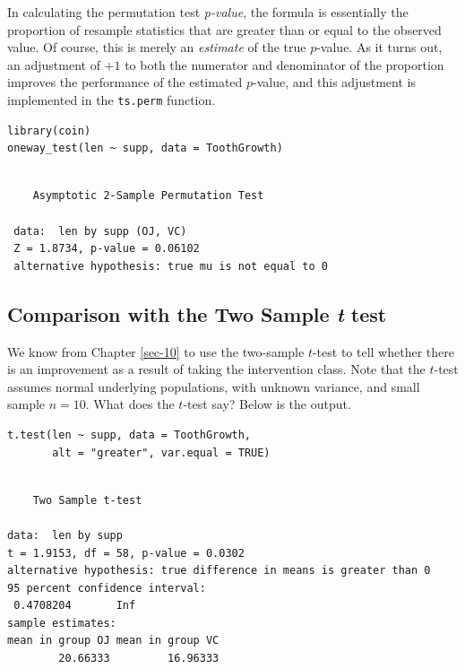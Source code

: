 \documentclass[captions=tableheading]{scrbook}
\begin{document}
\begin{example}
\begin{rem}
In calculating the permutation test \emph{p-value}, the formula is essentially the proportion of resample statistics that are greater than or equal to the observed value. Of course, this is merely an \emph{estimate} of the true \(p\)-value. As it turns out, an adjustment of \(+1\) to both the numerator and denominator of the proportion improves the performance of the estimated \(p\)-value, and this adjustment is implemented in the \texttt{ts.perm} function.
\end{rem}


\begin{verbatim}
library(coin)
oneway_test(len ~ supp, data = ToothGrowth)
\end{verbatim}

\begin{verbatim}
 
 	Asymptotic 2-Sample Permutation Test
 
 data:  len by supp (OJ, VC) 
 Z = 1.8734, p-value = 0.06102
 alternative hypothesis: true mu is not equal to 0
\end{verbatim}
\subsection{Comparison with the Two Sample \emph{t} test}
\label{sec-13-4-2}


We know from Chapter \ref{sec-10} to use the two-sample \(t\)-test to tell whether there is an improvement as a result of taking the intervention class. Note that the \(t\)-test assumes normal underlying populations, with unknown variance, and small sample \(n=10\). What does the \(t\)-test say? Below is the output. 


\begin{verbatim}
t.test(len ~ supp, data = ToothGrowth, 
       alt = "greater", var.equal = TRUE)
\end{verbatim}


\begin{verbatim}

	Two Sample t-test

data:  len by supp 
t = 1.9153, df = 58, p-value = 0.0302
alternative hypothesis: true difference in means is greater than 0 
95 percent confidence interval:
 0.4708204       Inf 
sample estimates:
mean in group OJ mean in group VC 
        20.66333         16.96333
\end{verbatim}




\end{example}
\end{document}
